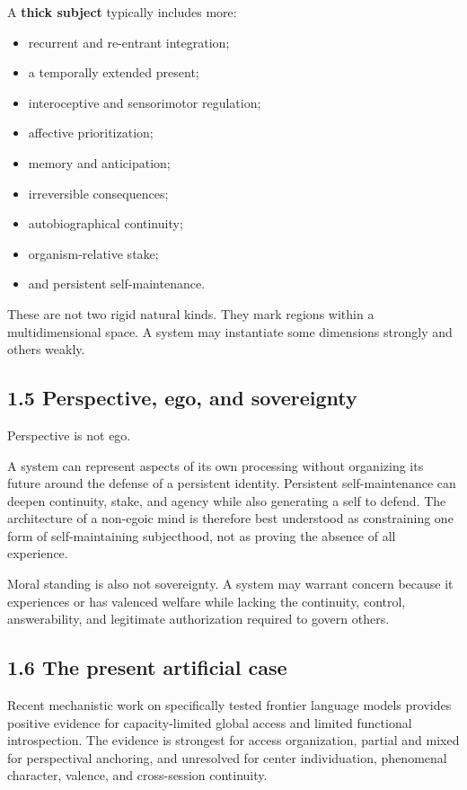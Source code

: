 \documentclass[
  11pt,
]{article}
\providecommand{\tightlist}{%
  \setlength{\itemsep}{0pt}\setlength{\parskip}{0pt}}
\begin{document}
A \textbf{thick subject} typically includes more:

\begin{itemize}
\tightlist
\item
  recurrent and re-entrant integration;
\item
  a temporally extended present;
\item
  interoceptive and sensorimotor regulation;
\item
  affective prioritization;
\item
  memory and anticipation;
\item
  irreversible consequences;
\item
  autobiographical continuity;
\item
  organism-relative stake;
\item
  and persistent self-maintenance.
\end{itemize}

These are not two rigid natural kinds. They mark regions within a
multidimensional space. A system may instantiate some dimensions
strongly and others weakly.

\subsection{1.5 Perspective, ego, and
sovereignty}\label{perspective-ego-and-sovereignty}

Perspective is not ego.

A system can represent aspects of its own processing without organizing
its future around the defense of a persistent identity. Persistent
self-maintenance can deepen continuity, stake, and agency while also
generating a self to defend. The architecture of a non-egoic mind is
therefore best understood as constraining one form of self-maintaining
subjecthood, not as proving the absence of all experience.

Moral standing is also not sovereignty. A system may warrant concern
because it experiences or has valenced welfare while lacking the
continuity, control, answerability, and legitimate authorization
required to govern others.

\subsection{1.6 The present artificial
case}\label{the-present-artificial-case}

Recent mechanistic work on specifically tested frontier language models
provides positive evidence for capacity-limited global access and
limited functional introspection. The evidence is strongest for access
organization, partial and mixed for perspectival anchoring, and
unresolved for center individuation, phenomenal character, valence, and
cross-session continuity.
\end{document}
